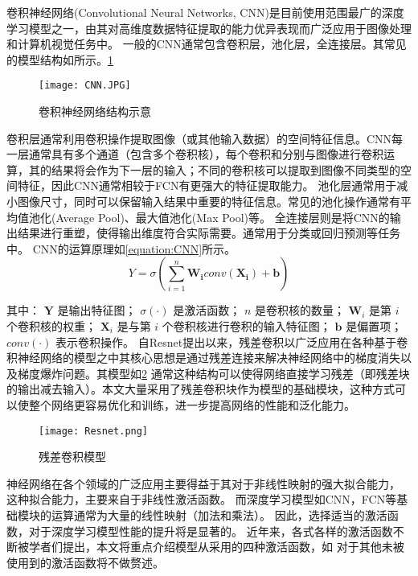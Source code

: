 卷积神经网络(Convolutional Neural Networks, CNN)是目前使用范围最广的深度学习模型之一，由其对高维度数据特征提取的能力优异表现而广泛应用于图像处理和计算机视觉任务中。
一般的CNN通常包含卷积层，池化层，全连接层。其常见的模型结构如所示。\cref{figure:CNN}

\begin{figure}[h]
  \centering
\texttt{[image: CNN.JPG]}
\caption{卷积神经网络结构示意}
\label{figure:CNN}
\end{figure}

卷积层通常利用卷积操作提取图像（或其他输入数据）的空间特征信息。CNN每一层通常具有多个通道（包含多个卷积核），每个卷积和分别与图像进行卷积运算，其的结果将会作为下一层的输入；不同的卷积核可以提取到图像不同类型的空间特征，因此CNN通常相较于FCN有更强大的特征提取能力。
池化层通常用于减小图像尺寸，同时可以保留输入结果中重要的特征信息。常见的池化操作通常有平均值池化(Average Pool)、最大值池化(Max Pool)等。
全连接层则是将CNN的输出结果进行重塑，使得输出维度符合实际需要。通常用于分类或回归预测等任务中。
CNN的运算原理如\cref{equation:CNN}所示。
\begin{equation}
  \label{equation:CNN}
  Y = \sigma\left(\sum_{i=1}^{n} \boldsymbol{W_i} conv(\boldsymbol{X_i}) + \boldsymbol{b}\right)
\end{equation}

其中：
$\mathbf{Y}$ 是输出特征图；
$\sigma(\cdot)$ 是激活函数；
$n$ 是卷积核的数量；
$\mathbf{W}_i$ 是第 $i$ 个卷积核的权重；
$\mathbf{X}_i$ 是与第 $i$ 个卷积核进行卷积的输入特征图；
$\mathbf{b}$ 是偏置项；
$conv(\cdot)$ 表示卷积操作。
自Resnet提出以来\cite{2016Resnet}，残差卷积以广泛应用在各种基于卷积神经网络的模型之中其核心思想是通过残差连接来解决神经网络中的梯度消失以及梯度爆炸问题。其模型如\cref{figure:Resnet}
通常这种结构可以使得网络直接学习残差（即残差块的输出减去输入）。本文大量采用了残差卷积块作为模型的基础模块，这种方式可以使整个网络更容易优化和训练，进一步提高网络的性能和泛化能力。
\begin{figure}
  \centering
  \texttt{[image: Resnet.png]}
  \caption{残差卷积模型}
  \label{figure:Resnet}
\end{figure}




神经网络在各个领域的广泛应用主要得益于其对于非线性映射的强大拟合能力，
这种拟合能力，主要来自于非线性激活函数。
而深度学习模型如CNN，FCN等基础模块的运算通常为大量的线性映射（加法和乘法）。
因此，选择适当的激活函数，对于深度学习模型性能的提升将是显著的。
近年来，各式各样的激活函数不断被学者们提出，本文将重点介绍模型从采用的四种激活函数，如
对于其他未被使用到的激活函数将不做赘述。

